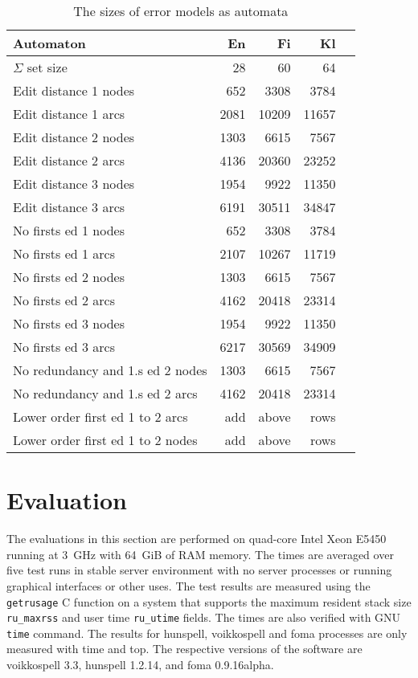 \documentclass[11pt]{article}
\begin{document}
\begin{table}[h]
\begin{center}
\begin{scriptsize}
\begin{tabular}{|l|rrrr|}
\hline
\bf Automaton & \bf En & \bf Fi & \bf Kl  \\ 
\hline
$\Sigma$ set size &
 28& 60& 64
\\
Edit distance 1 nodes &
 652& 3308& 3784
\\
Edit distance 1 arcs &
 2081& 10209& 11657
\\
Edit distance 2 nodes &
 1303& 6615& 7567
\\
Edit distance 2 arcs &
 4136& 20360& 23252
\\
Edit distance 3 nodes &
 1954& 9922& 11350
\\
Edit distance 3 arcs &
 6191& 30511& 34847
\\
No firsts ed 1 nodes & 
 652& 3308& 3784
\\
No firsts ed 1 arcs & 
 2107& 10267& 11719
\\
No firsts ed 2 nodes &
 1303& 6615& 7567
\\
No firsts ed 2 arcs &
 4162& 20418& 23314
\\
No firsts ed 3 nodes &
 1954& 9922& 11350
\\
No firsts ed 3 arcs &
 6217& 30569& 34909
\\
No redundancy and 1.s ed 2 nodes &
 1303& 6615& 7567
\\
No redundancy and 1.s ed 2 arcs &
 4162& 20418& 23314
\\
Lower order first ed 1 to 2 arcs &
add & above & rows
\\
Lower order first ed 1 to 2 nodes &
add & above & rows
\\
\hline
\end{tabular}
\end{scriptsize}
\end{center}
\caption{\label{table:error-sizes}
The sizes of error models as automata}
\end{table}


\section{Evaluation}
\label{sec:evaluation}

The evaluations in this section are performed on quad-core Intel Xeon E5450
running at 3~GHz with 64~GiB of RAM memory. The times are averaged over five
test runs in stable server environment with no server processes or running
graphical interfaces or other uses. The test results are measured using the
\texttt{getrusage} C function on a system that supports the maximum resident
stack size \texttt{ru\_maxrss} and user time \texttt{ru\_utime} fields. The
times are also verified with GNU \texttt{time} command. The results for
hunspell, voikkospell and foma processes are only measured with time and top.
The respective versions of the software are voikkospell 3.3, hunspell
1.2.14, and foma 0.9.16alpha.
\end{document}
